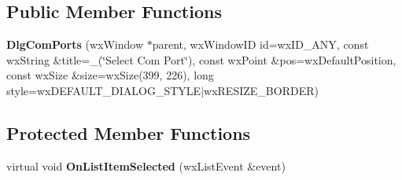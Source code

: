 \subsection*{Public Member Functions}
\begin{DoxyCompactItemize}
\item 
\hypertarget{class_dlg_com_ports_a3f410b6cd51d3cf06cb0b4b74963c63d}{{\bfseries Dlg\-Com\-Ports} (wx\-Window $\ast$parent, wx\-Window\-I\-D id=wx\-I\-D\-\_\-\-A\-N\-Y, const wx\-String \&title=\-\_\-(\char`\"{}Select Com Port\char`\"{}), const wx\-Point \&pos=wx\-Default\-Position, const wx\-Size \&size=wx\-Size(399, 226), long style=wx\-D\-E\-F\-A\-U\-L\-T\-\_\-\-D\-I\-A\-L\-O\-G\-\_\-\-S\-T\-Y\-L\-E$|$wx\-R\-E\-S\-I\-Z\-E\-\_\-\-B\-O\-R\-D\-E\-R)}\label{class_dlg_com_ports_a3f410b6cd51d3cf06cb0b4b74963c63d}

\end{DoxyCompactItemize}
\subsection*{Protected Member Functions}
\begin{DoxyCompactItemize}
\item 
\hypertarget{class_dlg_com_ports_a1a4cc254a36227c69954b7e7dabf3efc}{virtual void {\bfseries On\-List\-Item\-Selected} (wx\-List\-Event \&event)}\label{class_dlg_com_ports_a1a4cc254a36227c69954b7e7dabf3efc}

\end{DoxyCompactItemize}
